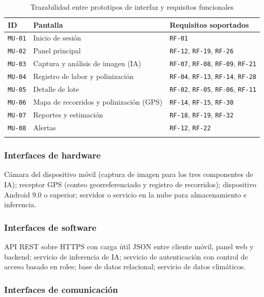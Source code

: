 \documentclass[11pt,a4paper]{article}
\newcommand{\id}[1]{\texttt{\begingroup\hyphenpenalty=10000\relax#1\endgroup}}
\renewcommand{\id}[1]{\texttt{#1}}
\begin{document}
\begin{longtable}{|C{1.6cm}|L{5.6cm}|L{7.6cm}|}
\hline
{}\textbf{ID} & \textbf{Pantalla} & \textbf{Requisitos soportados} \\
\hline
\endhead
\id{MU-01} & Inicio de sesión & \id{RF-01} \\ \hline
\id{MU-02} & Panel principal & \id{RF-12}, \id{RF-19}, \id{RF-26} \\ \hline
\id{MU-03} & Captura y análisis de imagen (IA) & \id{RF-07}, \id{RF-08}, \id{RF-09}, \id{RF-21} \\ \hline
\id{MU-04} & Registro de labor y polinización & \id{RF-04}, \id{RF-13}, \id{RF-14}, \id{RF-28} \\ \hline
\id{MU-05} & Detalle de lote & \id{RF-02}, \id{RF-05}, \id{RF-06}, \id{RF-11} \\ \hline
\id{MU-06} & Mapa de recorridos y polinización (GPS) & \id{RF-14}, \id{RF-15}, \id{RF-30} \\ \hline
\id{MU-07} & Reportes y estimación & \id{RF-18}, \id{RF-19}, \id{RF-32} \\ \hline
\id{MU-08} & Alertas & \id{RF-12}, \id{RF-22} \\ \hline
\caption{Trazabilidad entre prototipos de interfaz y requisitos funcionales}
\label{tab:mockups}
\end{longtable}

\subsubsection{Interfaces de hardware}

Cámara del dispositivo móvil (captura de imagen para los tres componentes de IA); receptor GPS
(conteo georreferenciado y registro de recorridos); dispositivo Android 9.0 o superior; servidor o
servicio en la nube para almacenamiento e inferencia.

\subsubsection{Interfaces de software}

API REST sobre HTTPS con carga útil JSON entre cliente móvil, panel web y backend; servicio de
inferencia de IA; servicio de autenticación con control de acceso basado en roles; base de datos
relacional; servicio de datos climáticos.

\subsubsection{Interfaces de comunicación}
\end{document}

